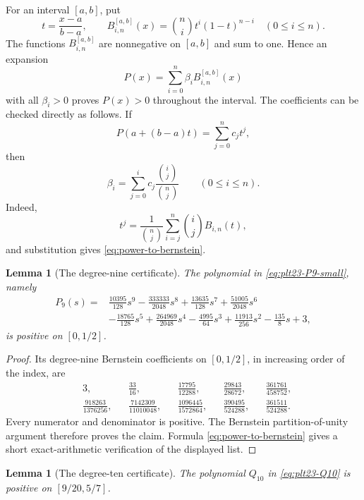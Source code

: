 \documentclass[11pt]{article}
\newtheorem{lemma}[theorem]{Lemma}
\numberwithin{equation}{section}
\begin{document}
For an interval $[a,b]$, put
\[
  t=\frac{x-a}{b-a},
  \qquad
  B^{[a,b]}_{i,n}(x)=\binom ni t^i(1-t)^{n-i}
  \quad(0\le i\le n).
\]
The functions $B^{[a,b]}_{i,n}$ are nonnegative on $[a,b]$ and sum to
one.  Hence an expansion
\[
  P(x)=\sum_{i=0}^n \beta_i B^{[a,b]}_{i,n}(x)
\]
with all $\beta_i>0$ proves $P(x)>0$ throughout the interval.  The
coefficients can be checked directly as follows.  If
\[
  P(a+(b-a)t)=\sum_{j=0}^n c_jt^j,
\]
then
\begin{equation}\label{eq:power-to-bernstein}
  \beta_i=
  \sum_{j=0}^i c_j\frac{\binom ij}{\binom nj}
  \qquad(0\le i\le n).
\end{equation}
Indeed,
\[
  t^j=\frac{1}{\binom nj}
  \sum_{i=j}^n\binom ij B_{i,n}(t),
\]
and substitution gives \eqref{eq:power-to-bernstein}.

\begin{lemma}[The degree-nine certificate]\label{lem:bernstein-P9}
  The polynomial in \eqref{eq:plt23-P9-small}, namely
  \begin{align*}
    P_9(s)={}&
    \frac{10395}{128}s^9
    -\frac{333333}{2048}s^8
    +\frac{13635}{128}s^7
    +\frac{51005}{2048}s^6\\
    &-\frac{18765}{128}s^5
    +\frac{264969}{2048}s^4
    -\frac{4995}{64}s^3
    +\frac{11913}{256}s^2
    -\frac{135}{8}s+3,
  \end{align*}
  is positive on $[0,1/2]$.
\end{lemma}

\begin{proof}
  Its degree-nine Bernstein coefficients on $[0,1/2]$, in increasing order
  of the index, are
  \begin{align*}
    &3,
    &&\frac{33}{16},
    &&\frac{17795}{12288},
    &&\frac{29843}{28672},
    &&\frac{361761}{458752},\\[1mm]
    &\frac{918263}{1376256},
    &&\frac{7142309}{11010048},
    &&\frac{1096445}{1572864},
    &&\frac{390495}{524288},
    &&\frac{361511}{524288}.
  \end{align*}
  Every numerator and denominator is positive.  The Bernstein
  partition-of-unity argument therefore proves the claim.  Formula
  \eqref{eq:power-to-bernstein} gives a short exact-arithmetic verification of
  the displayed list.
\end{proof}

\begin{lemma}[The degree-ten certificate]\label{lem:bernstein-Q10}
  The polynomial $Q_{10}$ in \eqref{eq:plt23-Q10} is positive on
  $[9/20,5/7]$.
\end{lemma}
\end{document}
